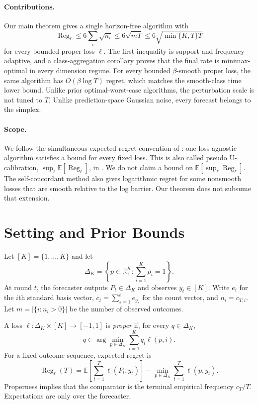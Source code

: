\documentclass[twoside]{article}
\newcommand{\E}{\mathbb E}
\newcommand{\R}{\mathbb R}
\newcommand{\Reg}{\operatorname{Reg}}
\begin{document}
\paragraph{Contributions.} Our main theorem gives a single horizon-free algorithm with
\[ \Reg_\ell\leq6\sum_i\sqrt{n_i}\leq6\sqrt{mT}\leq6\sqrt{\min\{K,T\}T} \] for every bounded proper loss $\ell$. The first inequality is support and frequency adaptive, and a class-aggregation corollary proves that the final rate is minimax-optimal in every dimension regime. For every bounded $\beta$-smooth proper loss, the same algorithm has $O(\beta\log T)$ regret, which matches the smooth-class time lower bound. Unlike prior optimal-worst-case algorithms, the perturbation scale is not tuned to $T$. Unlike prediction-space Gaussian noise, every forecast belongs to the simplex.

\paragraph{Scope.} We follow the simultaneous expected-regret convention of \citet{frongillo2026}: one loss-agnostic algorithm satisfies a bound for every fixed loss. This is also called pseudo U-calibration, $\sup_\ell\E[\Reg_\ell]$, in \citet{luo2024}. We do not claim a bound on $\E[\sup_\ell\Reg_\ell]$. The self-concordant method also gives logarithmic regret for some nonsmooth losses that are smooth relative to the log barrier. Our theorem does not subsume that extension.

\section{Setting and Prior Bounds}

Let $[K]=\{1,\ldots,K\}$ and let \[ \Delta_K=\left\{p\in\R_+^K:\sum_{i=1}^Kp_i=1\right\}. \] At round $t$, the forecaster outputs $P_t\in\Delta_K$ and observes $y_t\in[K]$. Write $e_i$ for the $i$th standard basis vector, $c_t=\sum_{s=1}^t e_{y_s}$ for the count vector, and $n_i=c_{T,i}$. Let $m=|\{i:n_i>0\}|$ be the number of observed outcomes.

A loss $\ell:\Delta_K\times[K]\to[-1,1]$ is \emph{proper} if, for every $q\in\Delta_K$, \[ q\in\arg\min_{p\in\Delta_K}\sum_{i=1}^Kq_i\ell(p,i). \] For a fixed outcome sequence, expected regret is \[ \Reg_\ell(T)=\E\!\left[\sum_{t=1}^T\ell(P_t,y_t)\right]-\min_{p\in\Delta_K}\sum_{t=1}^T\ell(p,y_t). \] Properness implies that the comparator is the terminal empirical frequency $c_T/T$. Expectations are only over the forecaster.
\end{document}
